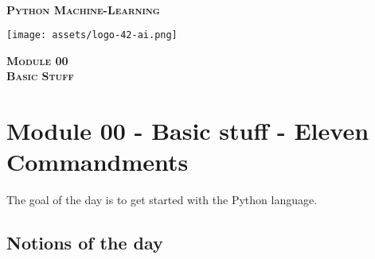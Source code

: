 \documentclass[]{article}
\date{}
\begin{document}

\vspace*{2cm}
\begin{center}
    \textsc{\fontsize{40}{48} \bfseries }\\[0.6cm]
    \textsc{\fontsize{39}{48} \bfseries { %
Python Machine-Learning
    }}\\[0.3cm]
\end{center}
\vspace{3cm}

\begin{center}
\texttt{[image: assets/logo-42-ai.png]}{\centering}
\end{center}

\vspace*{2cm}
\begin{center}
    \textsc{\fontsize{32}{48} \bfseries %
Module 00    
    }\\[0.6cm]
    \textsc{\fontsize{32}{48} \bfseries %
Basic Stuff    
    }\\[0.3cm]
\end{center}
\vspace{3cm}

\newpage

\setcounter{page}{1}



\hypertarget{module-00---basic-stuff---eleven-commandments}{%
\section{Module 00 - Basic stuff - Eleven
Commandments}\label{module-00---basic-stuff---eleven-commandments}}

The goal of the day is to get started with the Python language.

\hypertarget{notions-of-the-day}{%
\subsection{Notions of the day}\label{notions-of-the-day}}
\end{document}
